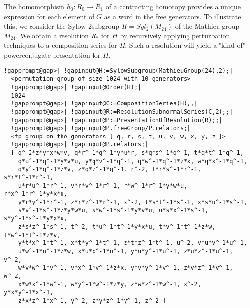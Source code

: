 \documentclass[a4paper,11pt]{report}
\begin{document}
{{\begin{Verbatim}[commandchars=!@|,fontsize=\small,frame=single,label=Example]
\end{Verbatim}
 

 The homomorphism $h_0\colon R_0 \rightarrow R_1$ of a contracting homotopy provides a unique expression for each element of $G$ as a word in the free generators. To illustrate this, we consider the Sylow $2$\texttt{}subgroup $H=Syl_2(M_{24})$ of the Mathieu group $M_{24}$. We obtain a resolution $R_\ast$ for $H$ by recursively applying perturbation techniques to a composition series for $H$. Such a resolution will yield a "kind of" power\texttt{}conjugate
presentation for $H$. 
\begin{Verbatim}[commandchars=!@|,fontsize=\small,frame=single,label=Example]
  !gapprompt@gap>| !gapinput@H:=SylowSubgroup(MathieuGroup(24),2);|
  <permutation group of size 1024 with 10 generators>
  !gapprompt@gap>| !gapinput@Order(H);|
  1024
  !gapprompt@gap>| !gapinput@C:=CompositionSeries(H);;|
  !gapprompt@gap>| !gapinput@R:=ResolutionSubnormalSeries(C,2);;|
  !gapprompt@gap>| !gapinput@P:=PresentationOfResolution(R);;|
  !gapprompt@gap>| !gapinput@P.freeGroup/P.relators;|
  <fp group on the generators [ q, r, s, t, u, v, w, x, y, z ]>
  !gapprompt@gap>| !gapinput@P.relators;|
  [ q^-2*z*y*x*w*v, q*r^-1*q^-1*y*u*r, s*q*s^-1*q^-1, t*q*t^-1*q^-1, 
    q*u^-1*q^-1*y*v*u, y*q*v^-1*q^-1, q*w^-1*q^-1*z*x, w*q*x^-1*q^-1, 
    q*y^-1*q^-1*z*v, z*q*z^-1*q^-1, r^-2, t*r*s^-1*r^-1, s*r*t^-1*r^-1, 
    u*r*u^-1*r^-1, v*r*v^-1*r^-1, r*w^-1*r^-1*y*w*u, r*x^-1*r^-1*y*x*u, 
    y*r*y^-1*r^-1, z*r*z^-1*r^-1, s^-2, t*s*t^-1*s^-1, x*s*u^-1*s^-1, 
    s*v^-1*s^-1*z*y*w*u, s*w^-1*s^-1*y*v*u, u*s*x^-1*s^-1, s*y^-1*s^-1*y*x*u, 
    z*s*z^-1*s^-1, t^-2, t*u^-1*t^-1*y*x*u, t*v^-1*t^-1*z*w, t*w^-1*t^-1*z*v, 
    y*t*x^-1*t^-1, x*t*y^-1*t^-1, z*t*z^-1*t^-1, u^-2, v*u*v^-1*u^-1, 
    u*w^-1*u^-1*z*w, x*u*x^-1*u^-1, y*u*y^-1*u^-1, z*u*z^-1*u^-1, v^-2, 
    w*v*w^-1*v^-1, v*x^-1*v^-1*z*x, y*v*y^-1*v^-1, z*v*z^-1*v^-1, w^-2, 
    x*w*x^-1*w^-1, w*y^-1*w^-1*z*y, z*w*z^-1*w^-1, x^-2, y*x*y^-1*x^-1, 
    z*x*z^-1*x^-1, y^-2, z*y*z^-1*y^-1, z^-2 ]
  
\end{Verbatim}
 

}}
\end{document}
